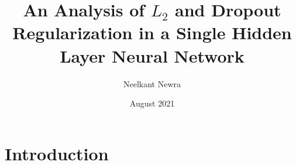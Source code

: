 \documentclass{article}
\title{\textbf{An Analysis of $L_2$ and Dropout Regularization in a Single Hidden Layer Neural Network}}
\author{Neelkant Newra}
\date{August 2021}
\begin{document}
\maketitle

\section{Introduction}
\end{document}
